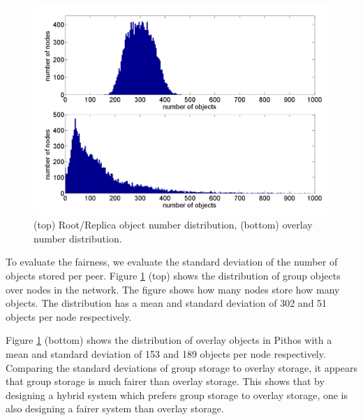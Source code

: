 \documentclass[10pt,a4paper,conference]{IEEEtran}
\begin{document}
\begin{figure}[htbp]
 \centering
 \includegraphics[clip=true, viewport=1cm 0.5cm 28.5cm 20cm, width=\columnwidth]{RootRepOverlayObjects}
 \caption{(top) Root/Replica object number distribution, (bottom) overlay number distribution.}
 \label{fig_group_overlay_objects}
\end{figure}
%
To evaluate the fairness, we evaluate the standard deviation of the number of objects stored per peer. Figure \ref{fig_group_overlay_objects} (top)
shows the distribution of group objects over nodes in the network. The figure shows how many nodes store how many objects. The distribution has a
mean and standard deviation of 302 and 51 objects per node respectively.

Figure \ref{fig_group_overlay_objects} (bottom) shows the distribution of overlay objects in Pithos with a mean and standard deviation of 153 and 189
objects per node respectively. Comparing the standard deviations of group storage to overlay storage, it appears that group storage is much fairer
than overlay storage. This shows that by designing a hybrid system which prefers group storage to overlay storage, one is also designing a fairer
system than overlay storage.
\end{document}
